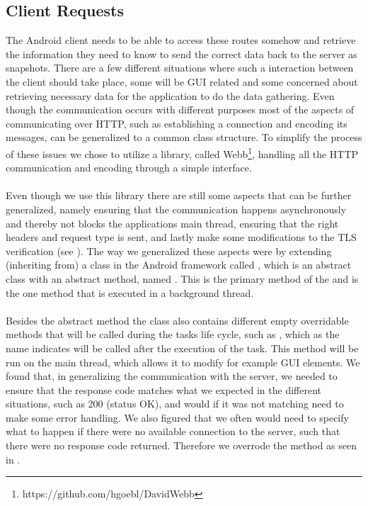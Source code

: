 \subsection{Client Requests}
\label{sub:client_requests}

The Android client needs to be able to access these routes somehow and retrieve the information they need to know to send the correct data back to the server as snapshots. There are a few different situations where such a interaction between the client should take place, some will be GUI related and some concerned about retrieving necessary data for the application to do the data gathering. Even though the communication occurs with different purposes most of the aspects of communicating over HTTP, such as establishing a connection and encoding its messages, can be generalized to a common class structure. To simplify the process of these issues we chose to utilize a library, called Webb\footnote{https://github.com/hgoebl/DavidWebb}, handling all the HTTP communication and encoding through a simple interface. 
\\\\
Even though we use this library there are still some aspects that can be further generalized, namely ensuring that the communication happens asynchronously and thereby not blocks the applications main thread, ensuring that the right headers and request type is sent, and lastly make some modifications to the TLS verification (see ). The way we generalized these aspects were by extending (inheriting from) a class in the Android framework called , which is an abstract class with an abstract method, named . This is the primary method of the  and is the one method that is executed in a background thread. 
\\\\
Besides the abstract method the class also contains different empty overridable methods that will be called during the tasks life cycle, such as , which as the name indicates will be called after the execution of the task. This method will be run on the main thread, which allows it to modify for example GUI elements. We found that, in generalizing the communication with the server, we needed to ensure that the response code matches what we expected in the different situations, such as 200 (status OK), and would if it was not matching need to make some error handling. We also figured that we often would need to specify what to happen if there were no available connection to the server, such that there were no response code returned. Therefore we overrode the  method as seen in . 

